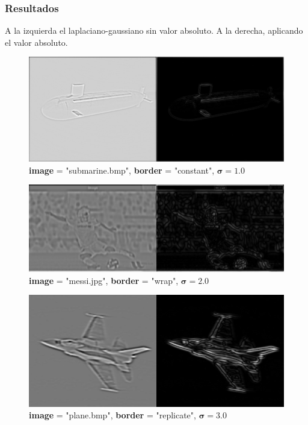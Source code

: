 \documentclass{article}
\begin{document}
\newpage

\subsubsection{Resultados}
A la izquierda el laplaciano-gaussiano sin valor absoluto. A la derecha, aplicando el valor absoluto.
\begin{figure}[hbt!]
	\centering
	\includegraphics[width=.9\textwidth]{assets/ex1-A/laplacian-constant-s1.jpg}
	\caption{\textbf{image} = "submarine.bmp", \textbf{border} = "constant", $\boldsymbol{\sigma} = 1.0$}
\end{figure}
\begin{figure}[hbt!]
	\centering
	\includegraphics[width=.9\textwidth]{assets/ex1-A/laplacian-wrap-s2.jpg}
	\caption{\textbf{image} = "messi.jpg", \textbf{border} = "wrap", $\boldsymbol{\sigma} = 2.0$}
\end{figure}
\begin{figure}[hbt!]
	\centering
	\includegraphics[width=.9\textwidth]{assets/ex1-A/laplacian-replicate-s3.jpg}
	\caption{\textbf{image} = "plane.bmp", \textbf{border} = "replicate", $\boldsymbol{\sigma} = 3.0$}
\end{figure}
\end{document}
